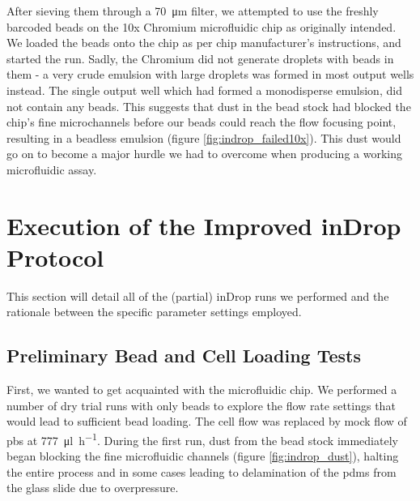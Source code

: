 After sieving them through a \SI{70}{\um} filter, we attempted to use the freshly barcoded beads on the 10x Chromium microfluidic chip as originally intended. We loaded the beads onto the chip as per chip manufacturer's instructions, and started the run. Sadly, the Chromium did not generate droplets with beads in them - a very crude emulsion with large droplets was formed in most output wells instead. The single output well which had formed a monodisperse emulsion, did not contain any beads. This suggests that dust in the bead stock had blocked the chip's fine microchannels before our beads could reach the flow focusing point, resulting in a beadless emulsion (figure \ref{fig:indrop_failed10x}). This dust would go on to become a major hurdle we had to overcome when producing a working microfluidic assay.\pms

\clearpage
\section{Execution of the Improved inDrop Protocol}
\label{sec:improved_indrop}
This section will detail all of the (partial) inDrop runs we performed and the rationale between the specific parameter settings employed.\pms

%
\subsection{Preliminary Bead and Cell Loading Tests}
First, we wanted to get acquainted with the microfluidic chip. We performed a number of dry trial runs with only beads to explore the flow rate settings that would lead to sufficient bead loading. The cell flow was replaced by mock flow of \acrshort{pbs} at \SI{777}{\ul\per\hour}. During the first run, dust from the bead stock immediately began blocking the fine microfluidic channels (figure \ref{fig:indrop_dust}), halting the entire process and in some cases leading to delamination of the \acrshort{pdms} from the glass slide due to overpressure.\pms

